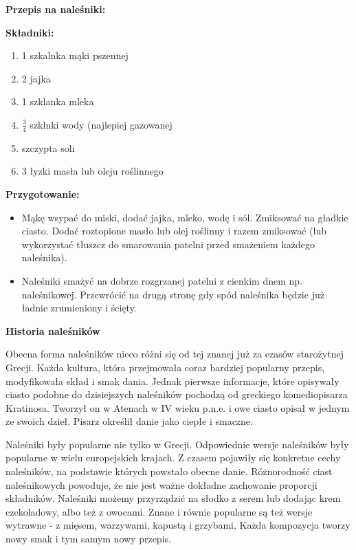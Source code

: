 

\newpage

{\Large{\bf Przepis na naleśniki:}\newline}

{\large {\bf Składniki:}}
\begin{enumerate}
    \item 1 szkalnka mąki pszennej
    \item 2 jajka
    \item  1 szklanka mleka
    \item $\frac{3}{4}$ szklnki wody (najlepiej gazowanej
    \item szczypta soli
    \item 3 łyzki masła lub oleju roślinnego
\end{enumerate}

{\large {\bf Przygotowanie:}}
\begin{itemize}
    \item Mąkę wsypać do miski, dodać jajka, mleko, wodę i sól. Zmiksować na gładkie ciasto. Dodać roztopione masło lub olej roślinny i razem zmiksować (lub wykorzystać tłuszcz do smarowania patelni przed smażeniem każdego naleśnika).
    \item 	Naleśniki smażyć na dobrze rozgrzanej patelni z cienkim dnem np. naleśnikowej. Przewrócić na drugą stronę gdy spód naleśnika będzie już ładnie zrumieniony i ścięty.
\end{itemize}

{\Large{\bf Historia naleśników}\newline}

Obecna forma naleśników nieco różni się od tej znanej już za czasów starożytnej Grecji. Każda kultura, która przejmowała coraz bardziej popularny przepis, modyfikowała skład i smak dania. Jednak pierwsze informacje, które opisywały ciasto podobne do dzisiejszych naleśników pochodzą od greckiego komediopisarza Kratinosa. Tworzył on w Atenach w IV wieku p.n.e. i owe ciasto opisał w jednym ze swoich dzieł. Pisarz określił danie jako ciepłe i smaczne.\newline

Naleśniki były popularne nie tylko w Grecji. Odpowiednie wersje naleśników były popularne w wielu europejskich krajach. Z czasem pojawiły się konkretne cechy naleśników, na podstawie których powstało obecne danie. Różnorodność ciast naleśnikowych powoduje, że nie jest ważne dokładne zachowanie proporcji składników. Naleśniki możemy przyrządzić na słodko z serem lub dodając krem czekoladowy, albo też z owocami. Znane i równie popularne są też wersje wytrawne - z mięsem, warzywami, kapustą i grzybami, Każda kompozycja tworzy nowy smak i tym samym nowy przepis.